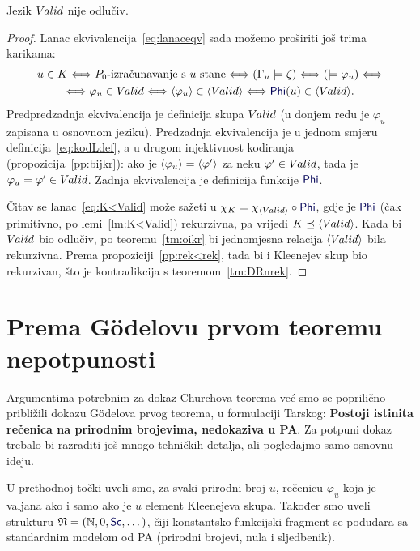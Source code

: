 \begin{propozicija}
Jezik $V\mspace{-1.5mu}alid$ nije odlučiv\!.
\end{propozicija}
\begin{proof}
Lanac ekvivalencija~\eqref{eq:lanaceqv} sada možemo proširiti još trima karikama:
\begin{multline}\label{eq:K<Valid}
    u\in K
    \Longleftrightarrow
    \text{$P_0$-izračunavanje s $u$ stane}
    \Longleftrightarrow
    (\Gamma_u\models\zeta)
    \Longleftrightarrow{}
    (\models\varphi_u)
    \Longleftrightarrow\\
    \Longleftrightarrow
    \varphi_u\in\Valid
    \Longleftrightarrow
    \kr{\varphi_u}\in\kr{\Valid}
    \Longleftrightarrow
    \f{Phi}(u)\in\kr{\Valid}
    \text.
\end{multline}
Predpredzadnja ekvivalencija je definicija skupa $V\mspace{-1.5mu}alid$ (u donjem redu je $\varphi_u$ zapisana u osnovnom jeziku). Predzadnja ekvivalencija je u jednom smjeru definicija~\eqref{eq:kodLdef}, a u drugom injektivnost kodiranja (propozicija~\ref{pp:bijkr}): ako je $\langle\varphi_u\rangle=\langle\varphi'\rangle$ za neku $\varphi'\in V\mspace{-1.5mu}alid$, tada je $\varphi_u=\varphi'\in V\mspace{-1.5mu}alid$. Zadnja ekvivalencija je definicija funkcije $\f{Phi}$.

	Čitav se lanac~\eqref{eq:K<Valid} može sažeti u $\chi_{K}=\chi_{\kr{\Valid}}\circ\f{Phi}$, gdje je $\f{Phi}$ (čak primitivno, po lemi~\ref{lm:K<Valid}) rekurzivna, pa vrijedi $K\preceq\langle V\mspace{-1.5mu}alid\rangle$.
Kada bi $V\mspace{-1.5mu}alid$ bio odlučiv\!, po teoremu~\ref{tm:oikr} bi jednomjesna relacija $\langle V\mspace{-1.5mu}alid\rangle$ bila rekurzivna. Prema propoziciji~\ref{pp:rek<rek}, tada bi i Kleenejev skup bio rekurzivan, što je kontradikcija s teoremom~\ref{tm:DRnrek}.
\end{proof}

\section{Prema Gödelovu prvom teoremu nepotpunosti}

Argumentima potrebnim za dokaz Churchova teorema već smo se poprilično približili dokazu Gödelova prvog teorema, u formulaciji Tarskog: \textbf{Postoji istinita rečenica na prirodnim brojevima, nedokaziva u PA\@}. Za potpuni dokaz trebalo bi razraditi još mnogo tehničkih detalja, ali pogledajmo samo osnovnu ideju.

U prethodnoj točki uveli smo, za svaki prirodni broj $u$, rečenicu $\varphi_u$ koja je valjana ako i samo ako je $u$ element Kleenejeva skupa. Također smo uveli strukturu $\mathfrak N=(\N,0,\f{Sc},\dotsc)$, čiji konstantsko-funkcijski fragment se podudara sa standardnim modelom od PA (prirodni brojevi, nula i sljedbenik).

